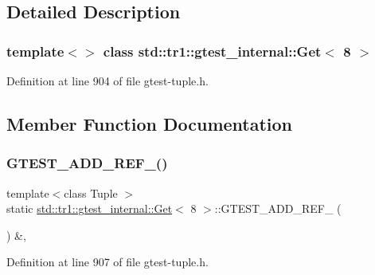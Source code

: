 \subsection{Detailed Description}
\subsubsection*{template$<$$>$\newline
class std\+::tr1\+::gtest\+\_\+internal\+::\+Get$<$ 8 $>$}



Definition at line 904 of file gtest-\/tuple.\+h.



\subsection{Member Function Documentation}
\mbox{\label{classstd_1_1tr1_1_1gtest__internal_1_1Get_3_018_01_4_adf667300b7efed278f4ee3bf4d2edb85}} 
\subsubsection{\texorpdfstring{G\+T\+E\+S\+T\+\_\+\+A\+D\+D\+\_\+\+R\+E\+F\+\_\+()}{GTEST\_ADD\_REF\_()}}
{\footnotesize\ttfamily template$<$class Tuple $>$ \\
static \hyperlink{classstd_1_1tr1_1_1gtest__internal_1_1Get}{std\+::tr1\+::gtest\+\_\+internal\+::\+Get}$<$ 8 $>$\+::G\+T\+E\+S\+T\+\_\+\+A\+D\+D\+\_\+\+R\+E\+F\+\_\+ (\begin{DoxyParamCaption}\item[{\hyperlink{gtest-tuple_8h_a1b7f133d8aa02e0b7afed7b66781eeb7}{G\+T\+E\+S\+T\+\_\+\+T\+U\+P\+L\+E\+\_\+\+E\+L\+E\+M\+E\+N\+T\+\_\+}(8, Tuple)}]{ }\end{DoxyParamCaption}) \&\hspace{0.3cm}{\ttfamily [inline]}, {\ttfamily [static]}}



Definition at line 907 of file gtest-\/tuple.\+h.


